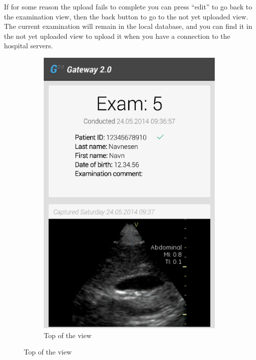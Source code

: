 If for some reason the upload fails to complete you can press “edit” to go back to the examination view, then the back button to go to the not yet uploaded view. The current examination will remain in the local database, and you can find it in the not yet uploaded view to upload it when you have a connection to the hospital servers.

\begin{figure}[H]
\centering
    \begin{subfigure}[b]{0.49\textwidth}
        \includegraphics[width=\textwidth]{img/interface/8-ReviewAndUpload.png}
        \caption*{Top of the view}
        \label{fig:08review}
    \end{subfigure}

\end{figure}
